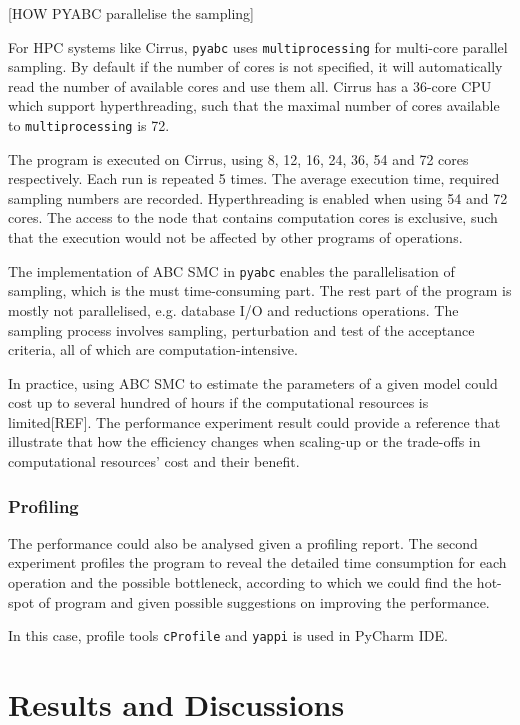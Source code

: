 \documentclass[12pt,a4paper]{report}
\begin{document}
[HOW PYABC parallelise the sampling]

For HPC systems like Cirrus, \verb|pyabc| uses \verb|multiprocessing| for multi-core parallel sampling. By default if the number of cores is not specified, it will automatically read the number of available cores and use them all. Cirrus has a 36-core CPU which support hyperthreading, such that the maximal number of cores available to \verb|multiprocessing| is 72.

The program is executed on Cirrus, using 8, 12, 16, 24, 36, 54 and 72 cores respectively. Each run is repeated 5 times. The average execution time, required sampling numbers are recorded. Hyperthreading is enabled when using 54 and 72 cores. The access to the node that contains computation cores is exclusive, such that the execution would not be affected by other programs of operations.

The implementation of ABC SMC in \verb|pyabc| enables the parallelisation of sampling, which is the must time-consuming part. The rest part of the program is mostly not parallelised, e.g. database I/O and reductions operations. The sampling process involves sampling, perturbation and test of the acceptance criteria, all of which are computation-intensive. 

In practice, using ABC SMC to estimate the parameters of a given model could cost up to several hundred of hours if the computational resources is limited[REF]. The performance experiment result could provide a reference that illustrate that how the efficiency changes when scaling-up or the trade-offs in computational resources' cost and their benefit.

\subsection{Profiling}

The performance could also be analysed given a profiling report. The second experiment profiles the program to reveal the detailed time consumption for each operation and the possible bottleneck, according to which we could find the hot-spot of program and given possible suggestions on improving the performance. 

In this case, profile tools \verb|cProfile| and \verb|yappi| is used in PyCharm IDE.



\chapter{Results and Discussions}
\end{document}
